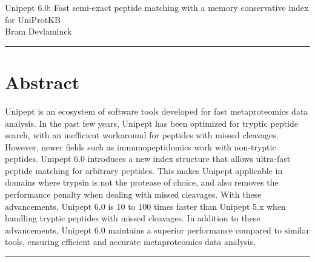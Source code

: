 \documentclass[11pt]{article}
\begin{document}
    \begingroup
    \centering
    \LARGE Unipept 6.0: Fast semi-exact peptide matching with a memory conservative index for UniProtKB\\[1em]
    \large Bram Devlaminck\\[2em]
    \endgroup

    \par\noindent\rule{\linewidth}{.5pt}
    \section*{Abstract}\label{sec:test-section}
    Unipept is an ecosystem of software tools developed for fast metaproteomics data analysis.
    In the past few years, Unipept has been optimized for tryptic peptide search, with an inefficient workaround for peptides with missed cleavages.
    However, newer fields such as immunopeptidomics work with non-tryptic peptides.
    Unipept 6.0 introduces a new index structure that allows ultra-fast peptide matching for arbitrary peptides.
    This makes Unipept applicable in domains where trypsin is not the protease of choice, and also removes the performance penalty when dealing with missed cleavages.
    With these advancements, Unipept 6.0 is 10 to 100 times faster than Unipept 5.x when handling tryptic peptides with missed cleavages.
    In addition to these advancements, Unipept 6.0 maintains a superior performance compared to similar tools, ensuring efficient and accurate metaproteomics data analysis.
    \par\noindent\rule{\linewidth}{.5pt}
\end{document}
